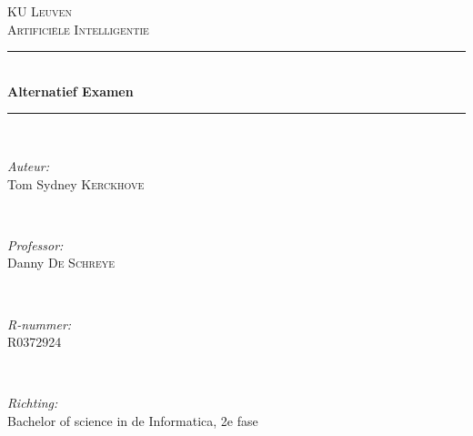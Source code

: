 \documentclass[10pt]{report}
\begin{document}
\begin{titlepage}


\thispagestyle{empty} %


\newcommand{\HRule}{\rule{\linewidth}{0.5mm}} %

\center %
 

\textsc{\LARGE KU Leuven}\\[1.5cm]
\textsc{\Large Artifici\"ele Intelligentie}\\[0.5cm]


\HRule \\[0.4cm]
{ \Huge \bfseries Alternatief Examen}\\
\HRule \\[2cm]
 

\begin{minipage}{0.4\textwidth}
\begin{flushleft} \large
\emph{Auteur:}\\
Tom Sydney \textsc{Kerckhove}
\end{flushleft}
\end{minipage}
~
\begin{minipage}{0.4\textwidth}
\begin{flushright} \large
\emph{Professor:} \\
Danny \textsc{De Schreye}
\end{flushright}
\end{minipage}\\[1cm]

\begin{minipage}{0.4\textwidth}
\begin{flushleft} \large
\emph{R-nummer:}\\
R0372924
\end{flushleft}
\end{minipage}
~
\begin{minipage}{0.4\textwidth}
\begin{flushright} \large
\emph{Richting:} \\
Bachelor of science in de Informatica, 2e fase
\end{flushright}
\end{minipage}


\end{titlepage}
\end{document}
